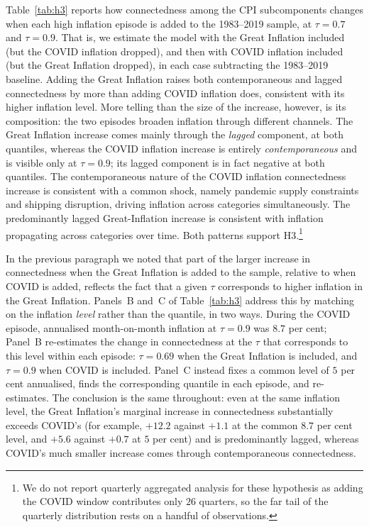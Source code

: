 \documentclass{article}
\begin{document}
Table~\ref{tab:h3} reports how connectedness among the CPI subcomponents changes when each high inflation episode is added to the  1983--2019 sample, at $\tau=0.7$ and $\tau=0.9$. That is, we estimate the model with the Great Inflation included (but the COVID inflation dropped), and then with COVID inflation included (but the Great Inflation dropped), in each case subtracting the 1983--2019 baseline. Adding the Great Inflation raises both contemporaneous and lagged connectedness by more than adding COVID inflation does, consistent with its higher inflation level. More telling than the size of the increase, however, is its composition: the two episodes broaden inflation through different channels. The Great Inflation increase comes mainly through the \emph{lagged} component, at both quantiles, whereas the COVID inflation increase is entirely \emph{contemporaneous} and is visible only at $\tau=0.9$; its lagged component is in fact negative at both quantiles. The contemporaneous nature of the COVID inflation connectedness increase is consistent with a common shock, namely pandemic supply constraints and shipping disruption, driving inflation across categories simultaneously.  The predominantly lagged Great-Inflation increase is consistent with inflation propagating across categories over time. Both patterns support H3.\footnote{We do not report quarterly aggregated analysis for these hypothesis as adding the COVID window contributes only $26$ quarters, so the far tail of the quarterly distribution rests on a handful of observations.}

In the previous paragraph we noted that part of the larger increase in connectedness when the Great Inflation is added to the sample, relative to when COVID is added, reflects the fact that a given $\tau$ corresponds to higher inflation in the Great Inflation. Panels~B and~C of Table~\ref{tab:h3} address this by matching on the inflation \emph{level} rather than the quantile, in two ways. During the COVID episode, annualised month-on-month inflation at $\tau=0.9$ was $8.7$ per cent; Panel~B re-estimates the change in connectedness at the $\tau$ that corresponds to this level within each episode: $\tau=0.69$ when the Great Inflation is included, and $\tau=0.9$ when COVID is included. Panel~C instead fixes a common level of $5$ per cent annualised, finds the corresponding quantile in each episode, and re-estimates. The conclusion is the same throughout: even at the same inflation level, the Great Inflation's marginal increase in connectedness substantially exceeds COVID's (for example, $+12.2$ against $+1.1$ at the common $8.7$ per cent level, and $+5.6$ against $+0.7$ at $5$ per cent) and is predominantly lagged, whereas COVID's much smaller increase comes through contemporaneous connectedness.
\end{document}
